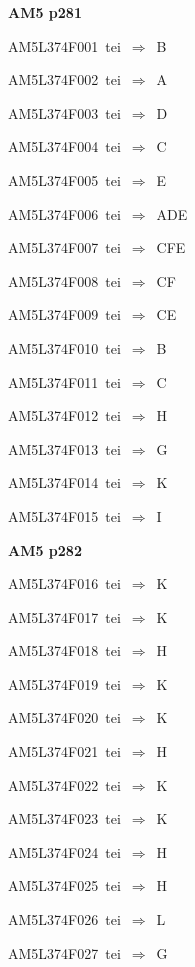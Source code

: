 \par\vfill\eject
{\bf\hfill AM5 p281\hfill\hbox{}}\par\bigskip
{\sixrm AM5L374F001\ {\sixit tei}\ }$\Rightarrow$\ B\par\smallskip
{\sixrm AM5L374F002\ {\sixit tei}\ }$\Rightarrow$\ A\par\smallskip
{\sixrm AM5L374F003\ {\sixit tei}\ }$\Rightarrow$\ D\par\smallskip
{\sixrm AM5L374F004\ {\sixit tei}\ }$\Rightarrow$\ C\par\smallskip
{\sixrm AM5L374F005\ {\sixit tei}\ }$\Rightarrow$\ E\par\smallskip
{\sixrm AM5L374F006\ {\sixit tei}\ }$\Rightarrow$\ ADE\par\smallskip
{\sixrm AM5L374F007\ {\sixit tei}\ }$\Rightarrow$\ CFE\par\smallskip
{\sixrm AM5L374F008\ {\sixit tei}\ }$\Rightarrow$\ CF\par\smallskip
{\sixrm AM5L374F009\ {\sixit tei}\ }$\Rightarrow$\ CE\par\smallskip
{\sixrm AM5L374F010\ {\sixit tei}\ }$\Rightarrow$\ B\par\smallskip
{\sixrm AM5L374F011\ {\sixit tei}\ }$\Rightarrow$\ C\par\smallskip
{\sixrm AM5L374F012\ {\sixit tei}\ }$\Rightarrow$\ H\par\smallskip
{\sixrm AM5L374F013\ {\sixit tei}\ }$\Rightarrow$\ G\par\smallskip
{\sixrm AM5L374F014\ {\sixit tei}\ }$\Rightarrow$\ K\par\smallskip
{\sixrm AM5L374F015\ {\sixit tei}\ }$\Rightarrow$\ I\par\smallskip

\par\vfill\eject
{\bf\hfill AM5 p282\hfill\hbox{}}\par\bigskip
{\sixrm AM5L374F016\ {\sixit tei}\ }$\Rightarrow$\ K\par\smallskip
{\sixrm AM5L374F017\ {\sixit tei}\ }$\Rightarrow$\ K\par\smallskip
{\sixrm AM5L374F018\ {\sixit tei}\ }$\Rightarrow$\ H\par\smallskip
{\sixrm AM5L374F019\ {\sixit tei}\ }$\Rightarrow$\ K\par\smallskip
{\sixrm AM5L374F020\ {\sixit tei}\ }$\Rightarrow$\ K\par\smallskip
{\sixrm AM5L374F021\ {\sixit tei}\ }$\Rightarrow$\ H\par\smallskip
{\sixrm AM5L374F022\ {\sixit tei}\ }$\Rightarrow$\ K\par\smallskip
{\sixrm AM5L374F023\ {\sixit tei}\ }$\Rightarrow$\ K\par\smallskip
{\sixrm AM5L374F024\ {\sixit tei}\ }$\Rightarrow$\ H\par\smallskip
{\sixrm AM5L374F025\ {\sixit tei}\ }$\Rightarrow$\ H\par\smallskip
{\sixrm AM5L374F026\ {\sixit tei}\ }$\Rightarrow$\ L\par\smallskip
{\sixrm AM5L374F027\ {\sixit tei}\ }$\Rightarrow$\ G\par\smallskip

